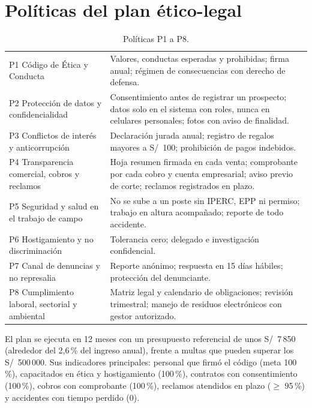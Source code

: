 \section{Políticas del plan ético-legal}

\begin{table}[H]
\centering
\caption{Políticas P1 a P8.}
\label{tab:anx-etica-politicas}
\small
\begin{tabularx}{\textwidth}{L{3.6cm}X}
\toprule
P1 Código de Ética y Conducta & Valores, conductas esperadas y prohibidas; firma anual; régimen de consecuencias con derecho de defensa. \\
P2 Protección de datos y confidencialidad & Consentimiento antes de registrar un prospecto; datos solo en el sistema con roles, nunca en celulares personales; fotos con aviso de finalidad. \\
P3 Conflictos de interés y anticorrupción & Declaración jurada anual; registro de regalos mayores a S/~100; prohibición de pagos indebidos. \\
P4 Transparencia comercial, cobros y reclamos & Hoja resumen firmada en cada venta; comprobante por cada cobro y cuenta empresarial; aviso previo de corte; reclamos registrados en plazo. \\
P5 Seguridad y salud en el trabajo de campo & No se sube a un poste sin IPERC, EPP ni permiso; trabajo en altura acompañado; reporte de todo accidente. \\
P6 Hostigamiento y no discriminación & Tolerancia cero; delegado e investigación confidencial. \\
P7 Canal de denuncias y no represalia & Reporte anónimo; respuesta en 15 días hábiles; protección del denunciante. \\
P8 Cumplimiento laboral, sectorial y ambiental & Matriz legal y calendario de obligaciones; revisión trimestral; manejo de residuos electrónicos con gestor autorizado. \\
\bottomrule
\end{tabularx}
\end{table}

\noindent El plan se ejecuta en 12 meses con un presupuesto referencial de unos S/~7\,850
(alrededor del 2,6\,\% del ingreso anual), frente a multas que pueden superar los S/~500\,000.
Sus indicadores principales: personal que firmó el código (meta 100\,\%), capacitados en ética
y hostigamiento (100\,\%), contratos con consentimiento (100\,\%), cobros con comprobante
(100\,\%), reclamos atendidos en plazo ($\geq$ 95\,\%) y accidentes con tiempo perdido (0).


